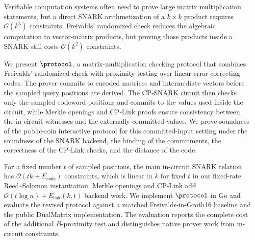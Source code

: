Verifiable computation systems often need to prove large matrix multiplication
statements, but a direct SNARK arithmetization of a \(k \times k\) product
requires \(\mathcal{O}(k^3)\) constraints. Freivalds' randomized check reduces
the algebraic computation to vector-matrix products, but proving those products
inside a SNARK still costs \(\mathcal{O}(k^2)\) constraints.

We present \(\protocol\), a matrix-multiplication checking protocol that combines
Freivalds' randomized check with proximity testing over linear error-correcting
codes. The prover commits to encoded matrices and intermediate vectors before
the sampled query positions are derived. The CP-SNARK circuit then checks only the sampled codeword positions and commits to the values used inside the circuit, while Merkle openings and CP-Link proofs ensure consistency between the in-circuit witnesses and the externally committed values. We prove soundness of the public-coin interactive protocol for this committed-input setting under the soundness of the SNARK backend, the binding of the commitments, the correctness of the CP-Link checks, and the distance of the code.

For a fixed number \(t\) of sampled positions, the main in-circuit SNARK
relation has \(\mathcal{O}(tk+E_{\mathsf{code}})\) constraints, which is linear
in \(k\) for fixed \(t\) in our fixed-rate Reed--Solomon instantiation.  Merkle
openings and CP-Link add
\(\mathcal{O}(t\log n)+E_{\mathsf{link}}(k,t)\) backend work. We implement
\(\protocol\) in Go and evaluate the revised protocol against a matched
Freivalds-in-Groth16 baseline and the public DualMatrix implementation.  The
evaluation reports the complete cost of the additional \(B\)-proximity test
and distinguishes native prover work from in-circuit constraints.
